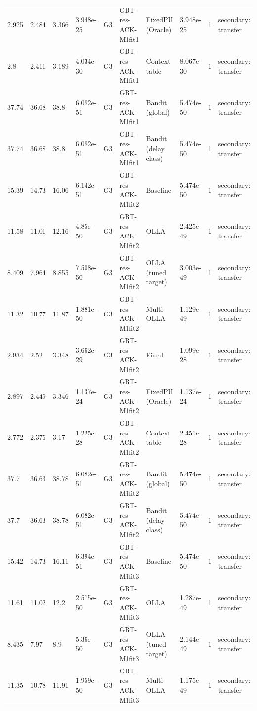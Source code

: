 \documentclass[10pt]{article}
\begin{document}
\begin{landscape}
\begin{longtable}{@{}llllllllll@{}}
2.925 & 2.484 & 3.366 & 3.948e-25 & G3 & GBT-res-ACK-M1fit1 & FixedPU (Oracle) & 3.948e-25 & 1 & secondary: transfer \\
2.8 & 2.411 & 3.189 & 4.034e-30 & G3 & GBT-res-ACK-M1fit1 & Context table & 8.067e-30 & 1 & secondary: transfer \\
37.74 & 36.68 & 38.8 & 6.082e-51 & G3 & GBT-res-ACK-M1fit1 & Bandit (global) & 5.474e-50 & 1 & secondary: transfer \\
37.74 & 36.68 & 38.8 & 6.082e-51 & G3 & GBT-res-ACK-M1fit1 & Bandit (delay class) & 5.474e-50 & 1 & secondary: transfer \\
15.39 & 14.73 & 16.06 & 6.142e-51 & G3 & GBT-res-ACK-M1fit2 & Baseline & 5.474e-50 & 1 & secondary: transfer \\
11.58 & 11.01 & 12.16 & 4.85e-50 & G3 & GBT-res-ACK-M1fit2 & OLLA & 2.425e-49 & 1 & secondary: transfer \\
8.409 & 7.964 & 8.855 & 7.508e-50 & G3 & GBT-res-ACK-M1fit2 & OLLA (tuned target) & 3.003e-49 & 1 & secondary: transfer \\
11.32 & 10.77 & 11.87 & 1.881e-50 & G3 & GBT-res-ACK-M1fit2 & Multi-OLLA & 1.129e-49 & 1 & secondary: transfer \\
2.934 & 2.52 & 3.348 & 3.662e-29 & G3 & GBT-res-ACK-M1fit2 & Fixed & 1.099e-28 & 1 & secondary: transfer \\
2.897 & 2.449 & 3.346 & 1.137e-24 & G3 & GBT-res-ACK-M1fit2 & FixedPU (Oracle) & 1.137e-24 & 1 & secondary: transfer \\
2.772 & 2.375 & 3.17 & 1.225e-28 & G3 & GBT-res-ACK-M1fit2 & Context table & 2.451e-28 & 1 & secondary: transfer \\
37.7 & 36.63 & 38.78 & 6.082e-51 & G3 & GBT-res-ACK-M1fit2 & Bandit (global) & 5.474e-50 & 1 & secondary: transfer \\
37.7 & 36.63 & 38.78 & 6.082e-51 & G3 & GBT-res-ACK-M1fit2 & Bandit (delay class) & 5.474e-50 & 1 & secondary: transfer \\
15.42 & 14.73 & 16.11 & 6.394e-51 & G3 & GBT-res-ACK-M1fit3 & Baseline & 5.474e-50 & 1 & secondary: transfer \\
11.61 & 11.02 & 12.2 & 2.575e-50 & G3 & GBT-res-ACK-M1fit3 & OLLA & 1.287e-49 & 1 & secondary: transfer \\
8.435 & 7.97 & 8.9 & 5.36e-50 & G3 & GBT-res-ACK-M1fit3 & OLLA (tuned target) & 2.144e-49 & 1 & secondary: transfer \\
11.35 & 10.78 & 11.91 & 1.959e-50 & G3 & GBT-res-ACK-M1fit3 & Multi-OLLA & 1.175e-49 & 1 & secondary: transfer \\

\end{longtable}
\end{landscape}
\end{document}
